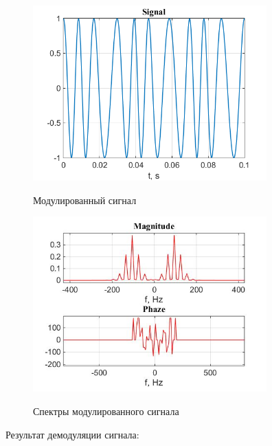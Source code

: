\documentclass[a4paper,14pt]{article}
\begin{document}
\begin{figure}[h]
\begin{multicols}{1}
\hfill
\includegraphics[width=90mm]{fr}
\hfill
\caption{Модулированный сигнал}
\label{figBottom}
\hfill
\includegraphics[width=90mm]{fr_spec}
\hfill
\caption{Спектры модулированного сигнала}
\label{figDown}
\end{multicols}
\end{figure}

Результат демодуляции сигнала:
\end{document}

